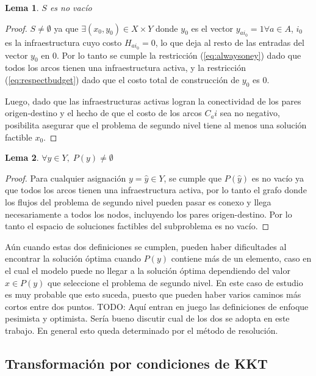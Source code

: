 \documentclass{article}
\newtheorem{lemma}{Lema}
\begin{document}
  \begin{lemma}$S$ es no vacío
  \end{lemma}

  \begin{proof}
    $S \neq \emptyset$ ya que $\exists (x_0, y_0) \in X \times Y$ donde $y_0$ es el vector $y_{ai_0} = 1 \forall a \in A$, $i_0$ es la infraestructura cuyo costo $H_{ai_0} = 0$, lo que deja al resto de las entradas del vector $y_0$ en $0$. Por lo tanto se cumple la restricción (\ref{eq:alwaysoney}) dado que todos los arcos tienen una infraestructura activa, y la restricción (\ref{eq:respectbudget}) dado que el costo total de construcción de $y_0$ es $0$.

    Luego, dado que las infraestructuras activas logran la conectividad de los pares origen-destino y el hecho de que el costo de los arcos $C_ai$ sea no negativo, posibilita asegurar que el problema de segundo nivel tiene al menos una solución factible $x_0$.
  \end{proof}

  \begin{lemma}$\forall y \in Y,\; P(y) \neq \emptyset$
  \end{lemma}

  \begin{proof}
    Para cualquier asignación $y = \hat{y} \in Y$, se cumple que $P(\hat{y})$ es no vacío ya que todos los arcos tienen una infraestructura activa, por lo tanto el grafo donde los flujos del problema de segundo nivel pueden pasar es conexo y llega necesariamente a todos los nodos, incluyendo los pares origen-destino. Por lo tanto el espacio de soluciones factibles del subproblema es no vacío. 
  \end{proof}

  Aún cuando estas dos definiciones se cumplen, pueden haber dificultades al encontrar la solución óptima cuando $P(y)$ contiene más de un elemento, caso en el cual el modelo puede no llegar a la solución óptima dependiendo del valor $x \in P(y)$ que seleccione el problema de segundo nivel. En este caso de estudio es muy probable que esto suceda, puesto que pueden haber varios caminos más cortos entre dos puntos.
  TODO: Aquí entran en juego las definiciones de enfoque pesimista y optimista. Sería bueno discutir cual de los dos se adopta en este trabajo. En general esto queda determinado por el método de resolución.

  \subsection{Transformación por condiciones de KKT}
  \label{sec:kkttransform}
\end{document}
